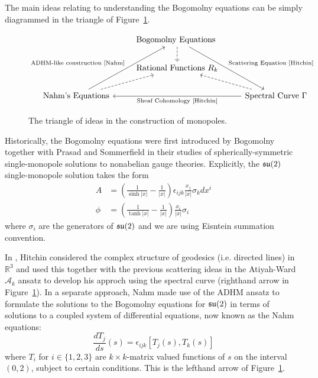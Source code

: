 	The main ideas relating to understanding the Bogomolny equations can be simply diagrammed in the triangle of Figure~\ref{fig:triangle}. 
	\begin{figure}
		\[
		\begin{tikzcd}
		& \text{Bogomolny Equations } \arrow[ddr,"\text{Scattering Equation [Hitchin]}"] \arrow[d,dashed] &\\
		& \text{Rational Functions } R_k & \\
		\text{Nahm's Equations}\arrow[uur,"\text{ADHM-like construction [Nahm]}"] \arrow[ur, dashed] && \text{Spectral Curve } \Gamma \arrow[ll,"\text{Sheaf Cohomology [Hitchin]}"] \arrow[ul, dashed]
		\end{tikzcd}
		\]
		\caption{The triangle of ideas in the construction of monopoles.}
		\label{fig:triangle}
	\end{figure}

	Historically, the Bogomolny equations were first introduced by Bogomolny \cite{bogomolny1976} together with Prasad and Sommerfield \cite{prasad1975} in their studies of spherically-symmetric single-monopole solutions to nonabelian gauge theories. Explicitly, the $\frak{su}(2)$ single-monopole solution takes the form
	\begin{equation*}
		\begin{aligned}
			A &= \left(\frac{1}{\sinh{|x|}} - \frac{1}{|x|} \right) \epsilon_{ijk} \frac{x_j}{|x|} \sigma_k dx^i\\
			\phi &= \left(\frac{1}{\tanh{|x|}} - \frac{1}{|x|} \right) \frac{x_i}{|x|} \sigma_i
		\end{aligned}
	\end{equation*}
	where $\sigma_i$ are the generators of $\frak{su}(2)$ and we are using Eisntein summation convention.
	
	In \cite{hitchin1982}, Hitchin considered the complex structure of geodesics (i.e. directed lines) in $\mathbb R^3$ and used this together with the previous scattering ideas in the Atiyah-Ward $\mathcal A_k$ ansatz \cite{atiyah1977} to develop his approch using the spectral curve (righthand arrow in Figure~\ref{fig:triangle}). 
	In a separate approach, Nahm \cite{nahm1982} made use of the ADHM ansatz to formulate the solutions to the Bogomolny equations for $\frak{su}(2)$ in terms of solutions to a coupled system of differential equations, now known as the Nahm equations:
	\begin{equation*}
		\frac{dT_j}{ds}(s) = \epsilon_{ijk} [T_j(s), T_k(s)]
	\end{equation*} 
	where $T_i$ for $i \in \{1, 2, 3\}$ are $k\times k$-matrix valued functions of $s$ on the interval $(0, 2)$, subject to certain conditions. This is the lefthand arrow of Figure~\ref{fig:triangle}.
	
